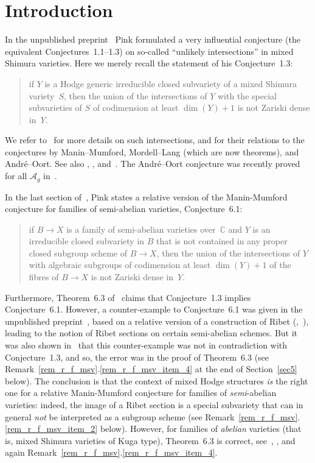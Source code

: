 \documentclass[JEP,XML,SOM,Unicode,NoFloatCountersInSection]{cedram}
\let\mathcal\mathscr
\theoremstyle{plain}
\theoremstyle{definition}
\numberwithin{equation}{subsection}
\renewcommand{\C}{\mathbb C}
\begin{document}
\maketitle
\tableofcontents
\mainmatter

\section{Introduction}
In the unpublished preprint~\cite{Pink2} Pink formulated a very
influential conjecture (the equivalent Conjectures~1.1--1.3) on
so-called ``unlikely intersections'' in mixed Shimura varieties.
Here we merely recall the statement of his Conjecture~1.3:
\begin{quote}
if $Y$ is a Hodge generic irreducible closed subvariety of a mixed
Shimura variety~$S$, then the union of the intersections of $Y$ with
the special subvarieties of $S$ of codimension at least $\dim(Y)+1$
is not Zariski dense in~$Y$.
\end{quote}
We refer to~\cite{Zannier} for more details on such intersections, and
for their relations to the conjectures by Manin--Mumford,
Mordell--Lang (which are now theorems), and André--Oort. See also
\cite{Pink2}, \cite{Pink1}, and~\cite{KUY}. The André--Oort
conjecture was recently proved for all $\mathcal{A}_g$
in~\cite{Tsimerman}.

In the last section of~\cite{Pink2}, Pink states a relative version of
the Manin-Mumford conjecture for families of semi-abelian varieties,
Conjecture~6.1:
\begin{quote}
if $B\to X$ is a family of semi-abelian varieties over~$\C$ and $Y$
is an irreducible closed subvariety in $B$ that is not contained in
any proper closed subgroup scheme of $B\to X$, then the union of the
intersections of $Y$ with algebraic subgroups of
codimension at least $\dim(Y)+1$ of the fibres of $B\to X$ is not
Zariski dense in~$Y$.
\end{quote}
Furthermore, Theorem~6.3 of~\cite{Pink2} claims that Conjecture~1.3
implies Conjecture~6.1. However, a counter-example to Conjecture~6.1
was given in the unpublished preprint~\cite{Bertrand11}, based on a
relative version of a construction of Ribet
(\cite{Jacquinot-Ribet},~\cite{Ribet}), leading to the notion of Ribet
sections on certain semi-abelian schemes. But it was also shown
in~\cite{Bertrand11} that this counter-example was not in
contradiction with Conjecture~1.3, and so, the error was in the proof
of Theorem~6.3 (see
Remark~\ref{rem_r_f_msv}.\ref{rem_r_f_msv_item_4} at the end of
Section~\ref{sec5} below). The conclusion is
that the context of mixed Hodge structures \emph{is} the right one for
a relative Manin-Mumford conjecture for families of
\emph{semi}-abelian varieties: indeed, the image of a Ribet section is
a special subvariety that can in general \emph{not} be interpreted as
a subgroup scheme (see
Remark~\ref{rem_r_f_msv}.\ref{rem_r_f_msv_item_2} below). However, for
families of \emph{abelian} varieties (that is, mixed Shimura varieties
of Kuga type), Theorem~6.3 is correct, see~\cite[Prop.\,4.6]{Pink1}, \cite[Prop.\,3.4]{Gao-Pisa}, and again
Remark~\ref{rem_r_f_msv}.\ref{rem_r_f_msv_item_4}.
\end{document}
